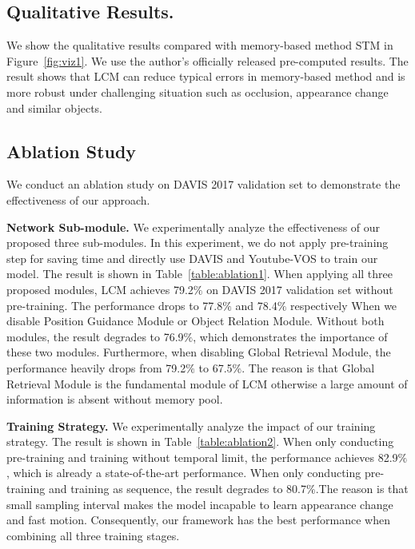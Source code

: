 \documentclass[final]{cvpr}
\begin{document}
\begin{figure*}[h]
\begin{center}
	\setlength{\fboxrule}{0pt}
\end{center}
\caption{Qualitative results of our proposed LCM. Our model is more robust under challenging situation such as occlusion, appearance change and similar objects.}
\label{fig:viz1}
\end{figure*}



\subsection{Qualitative Results. }
We show the qualitative results compared with memory-based method STM in Figure~\ref{fig:viz1}. We use the author’s officially released pre-computed results. 
The result shows that LCM can reduce typical errors in memory-based method and is more robust under challenging situation such as occlusion, appearance change and similar objects. 



\subsection{Ablation Study}
We conduct an ablation study on DAVIS 2017 validation set to demonstrate the effectiveness of our approach.

\textbf{Network Sub-module. }
We experimentally analyze the effectiveness of our proposed three sub-modules. In this experiment, we do not apply pre-training step for saving time and directly use DAVIS and Youtube-VOS to train our model. The result is shown in Table~\ref{table:ablation1}. When applying all three proposed modules, LCM achieves 79.2$\%$ on DAVIS 2017 validation set without pre-training. The performance drops to 77.8$\%$ and 78.4$\%$ respectively When we disable Position Guidance Module or Object Relation Module. Without both modules, the result degrades to 76.9$\%$, which demonstrates the importance of these two modules. Furthermore, when disabling Global Retrieval Module, the performance heavily drops from 79.2$\%$ to 67.5$\%$. The reason is that Global Retrieval Module is the fundamental module of LCM otherwise a large amount of information is absent without memory pool. 

\textbf{Training Strategy. }
We experimentally analyze the impact of our training strategy. The result is shown in Table~\ref{table:ablation2}. When only conducting pre-training and training without temporal limit, the performance achieves 82.9$\%$, which is already a state-of-the-art performance. When only conducting pre-training and training as sequence, the result degrades to 80.7$\%$.The reason is that small sampling interval makes the model incapable to learn appearance change and fast motion. Consequently, our framework has the best performance when combining all three training stages.
\end{document}
